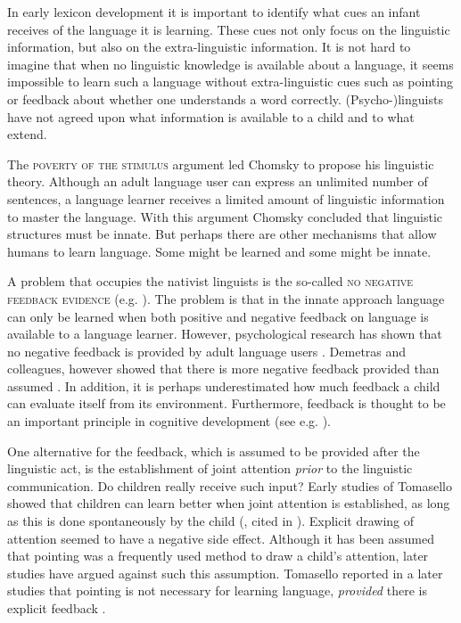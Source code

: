 In early lexicon development it is important to identify what cues an infant receives of the language it is learning. These cues not only focus on the linguistic information, but also on the extra-linguistic information. It is not hard to imagine that when no linguistic knowledge is available about a language, it seems impossible to learn such a language without extra-linguistic cues such as pointing or feedback about whether one understands a word correctly. (Psycho-)\allowbreak linguists have not agreed upon what information is available to a child and to what extend.

The {\scshape poverty of the stimulus} argument led Chomsky to propose his linguistic theory. Although an adult language user can express an unlimited number of sentences, a language learner receives a limited amount of linguistic information to master the language. With this argument Chomsky concluded that linguistic structures must be innate. But perhaps there are other mechanisms that allow humans to learn language. Some might be learned and some might be innate.


A problem that occupies the nativist linguists is the so-called {\scshape no negative feedback evidence} (e.g. \citealt{bowerman:1988}). The problem is that in the innate approach language can only be learned when both positive and negative feedback on language is available to a language learner. However, psychological research has shown that no negative feedback is provided by adult language users \citep{braine:1971}. Demetras and colleagues, however showed that there is more negative feedback provided than assumed \citep{demetrasetal:1986}. In addition, it is perhaps underestimated how much feedback a child can evaluate itself from its environment. Furthermore, feedback is thought to be an important principle in cognitive development (see e.g. \citealt{clancey:1997}).


One alternative for the feedback, which is assumed to be provided after the linguistic act, is the establishment of joint attention {\em prior} to the linguistic communication. Do children really receive such input? Early studies of Tomasello showed that children can learn better when joint attention is established, as long as this is done spontaneously by the child (\citealt{tomaselloetal:1986}, cited in \citealt{barrett:1995}). Explicit drawing of attention seemed to have a negative side effect. Although it has been assumed that pointing was a frequently used method to draw a child's attention, later studies have argued against such this assumption. Tomasello reported in a later studies that pointing is not necessary for learning language, {\em provided} there is explicit feedback \citep{tomasellobarton:1994}. 

